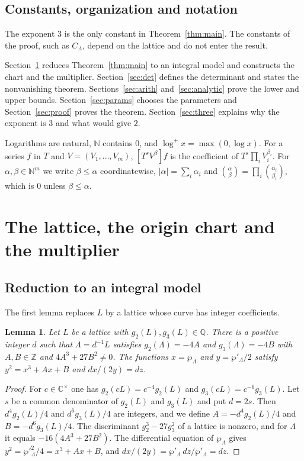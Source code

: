 \documentclass[11pt]{amsart}
\newtheorem{lemma}[theorem]{Lemma}
\theoremstyle{definition}
\theoremstyle{remark}
\numberwithin{equation}{section}
\newcommand{\Z}{\mathbb Z}
\newcommand{\Q}{\mathbb Q}
\newcommand{\C}{\mathbb C}
\newcommand{\N}{\mathbb N}
\begin{document}
\subsection{Constants, organization and notation}
The exponent $3$ is the only constant in Theorem~\ref{thm:main}. The constants of the proof, such as
$C_\Lambda$, depend on the lattice and do not enter the result.

Section~\ref{sec:chart} reduces Theorem~\ref{thm:main} to an integral model and constructs the chart and the
multiplier. Section~\ref{sec:det} defines the determinant and states the nonvanishing theorem.
Sections~\ref{sec:arith} and~\ref{sec:analytic} prove the lower and upper bounds. Section~\ref{sec:params}
chooses the parameters and Section~\ref{sec:proof} proves the theorem. Section~\ref{sec:three} explains why the
exponent is $3$ and what would give $2$.

Logarithms are natural, $\N$ contains $0$, and $\log^+x=\max(0,\log x)$. For a series $f$ in $T$ and
$V=(V_1,\dots,V_m)$, $[T^sV^\beta]f$ is the coefficient of $T^s\prod_iV_i^{\beta_i}$. For
$\alpha,\beta\in\N^m$ we write $\beta\le\alpha$ coordinatewise, $|\alpha|=\sum_i\alpha_i$ and
$\binom\alpha\beta=\prod_i\binom{\alpha_i}{\beta_i}$, which is $0$ unless $\beta\le\alpha$.

\section{The lattice, the origin chart and the multiplier}\label{sec:chart}

\subsection{Reduction to an integral model}
The first lemma replaces $L$ by a lattice whose curve has integer coefficients.

\begin{lemma}\label{lem:integral}
Let $L$ be a lattice with $g_2(L),g_3(L)\in\Q$. There is a positive integer $d$ such that $\Lambda=d^{-1}L$
satisfies $g_2(\Lambda)=-4A$ and $g_3(\Lambda)=-4B$ with $A,B\in\Z$ and $4A^3+27B^2\ne0$. The functions
$x=\wp_\Lambda$ and $y=\wp'_\Lambda/2$ satisfy $y^2=x^3+Ax+B$ and $dx/(2y)=dz$.
\end{lemma}

\begin{proof}
For $c\in\C^\times$ one has $g_2(cL)=c^{-4}g_2(L)$ and $g_3(cL)=c^{-6}g_3(L)$. Let $s$ be a common denominator
of $g_2(L)$ and $g_3(L)$ and put $d=2s$. Then $d^4g_2(L)/4$ and $d^6g_3(L)/4$ are integers, and we define
$A=-d^4g_2(L)/4$ and $B=-d^6g_3(L)/4$. The discriminant $g_2^3-27g_3^2$ of a lattice is nonzero, and for
$\Lambda$ it equals $-16(4A^3+27B^2)$. The differential equation of $\wp_\Lambda$ gives
$y^2=\wp'^2_\Lambda/4=x^3+Ax+B$, and $dx/(2y)=\wp'_\Lambda\,dz/\wp'_\Lambda=dz$.
\end{proof}
\end{document}
